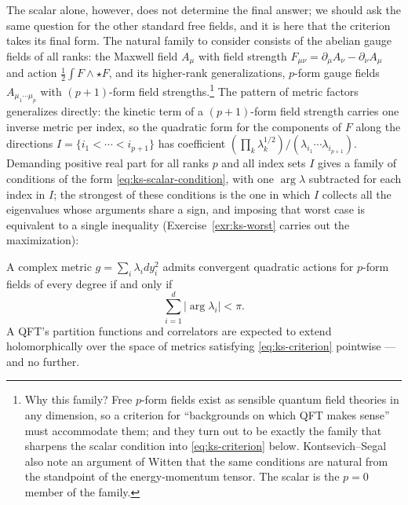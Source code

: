 The scalar alone, however, does not determine the final answer; we should
ask the same question for the other standard free fields, and it is here
that the criterion takes its final form. The natural family to consider
consists of the abelian gauge fields of all ranks: the Maxwell field $A_\mu$
with field strength $F_{\mu\nu} = \partial_\mu A_\nu - \partial_\nu A_\mu$
and action $\frac12\int F \wedge \star F$, and its higher-rank
generalizations, $p$-form gauge fields $A_{\mu_1\cdots\mu_p}$ with
$(p+1)$-form field strengths.\footnote{Why this family? Free $p$-form fields
exist as sensible quantum field theories in any dimension, so a criterion
for ``backgrounds on which QFT makes sense'' must accommodate them; and they
turn out to be exactly the family that sharpens the scalar condition into
\eqref{eq:ks-criterion} below. Kontsevich--Segal also note an argument of
Witten that the same conditions are natural from the standpoint of the
energy-momentum tensor. The scalar is the $p = 0$ member of the family.}
The pattern of metric factors generalizes directly: the kinetic term of a
$(p+1)$-form field strength carries one inverse metric per index, so the
quadratic form for the components of $F$ along the directions $I = \{i_1 <
\cdots < i_{p+1}\}$ has coefficient $\left(\prod_k \lambda_k^{1/2}\right) /
(\lambda_{i_1} \cdots \lambda_{i_{p+1}})$. Demanding positive real part for
all ranks $p$ and all index sets $I$ gives a family of conditions of the
form \eqref{eq:ks-scalar-condition}, with one $\arg\lambda$ subtracted for
each index in $I$; the strongest of these conditions is the one in which $I$
collects all the eigenvalues whose arguments share a sign, and imposing that
worst case is equivalent to a single inequality
(Exercise~\ref{exr:ks-worst} carries out the maximization):

\begin{ttheorem}
\label{thm:ks}
A complex metric $g = \sum_i \lambda_i dy_i^2$ admits convergent quadratic
actions for $p$-form fields of every degree if and only if
\begin{equation}
\sum_{i=1}^{d} \left|\arg \lambda_i \right| < \pi .
\label{eq:ks-criterion}
\end{equation}
A QFT's partition functions and correlators are expected to extend
holomorphically over the space of metrics satisfying \eqref{eq:ks-criterion}
pointwise --- and no further.
\end{ttheorem}

